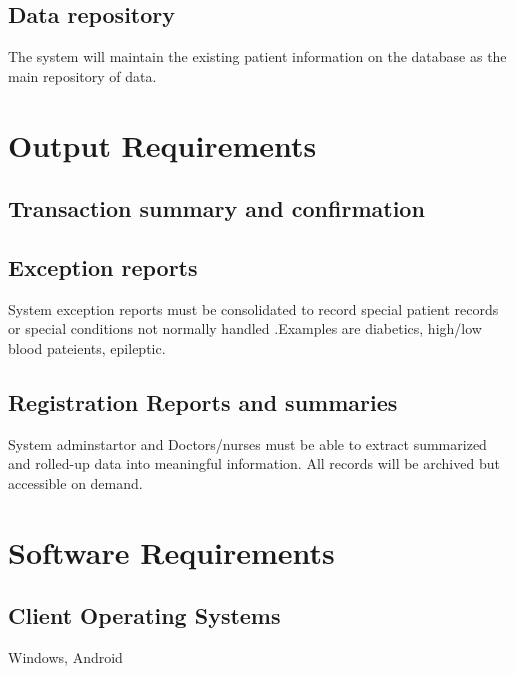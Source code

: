 \documentclass[12pt]{article}
\begin{document}
\subsection{Data repository}
The  system will maintain the existing patient information on the database as the main repository of data.
\section{Output Requirements}
\subsection{Transaction summary and confirmation}
\subsection{Exception reports}
System exception reports must be consolidated to record special patient records or special conditions not normally handled .Examples are diabetics, high/low blood pateients, epileptic.
\subsection{Registration Reports and summaries}
System adminstartor and Doctors/nurses must be able to extract summarized and rolled-up data into meaningful
information. All records will be archived but accessible on demand.
\section{Software Requirements}
\subsection{Client Operating Systems}
Windows, Android
\end{document}
